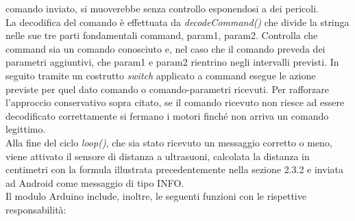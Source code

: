 comando inviato, si muoverebbe senza controllo esponendosi a dei pericoli.\\
La decodifica del comando è effettuata da \emph{decodeCommand()} che divide la stringa 
nelle sue tre parti fondamentali command, param1, param2. Controlla che command
sia un comando conosciuto e, nel caso che il comando preveda dei parametri aggiuntivi,
che param1 e param2 rientrino negli intervalli previsti. In seguito tramite un costrutto 
\emph{switch} applicato a command esegue le azione previste per quel dato comando o comando-parametri
ricevuti. Per rafforzare l'approccio conservativo sopra citato, se il comando 
ricevuto non riesce ad essere decodificato correttamente 
si fermano i motori finché non arriva un comando legittimo.\\
Alla fine del ciclo \emph{loop()}, che sia stato ricevuto un messaggio corretto o meno,
viene attivato il sensore di distanza a ultrasuoni, calcolata la distanza in centimetri
con la formula illustrata precedentemente nella sezione 2.3.2 e inviata ad Android
come messaggio di tipo INFO.\\
Il modulo Arduino include, inoltre, le seguenti funzioni con le rispettive responsabilità:
